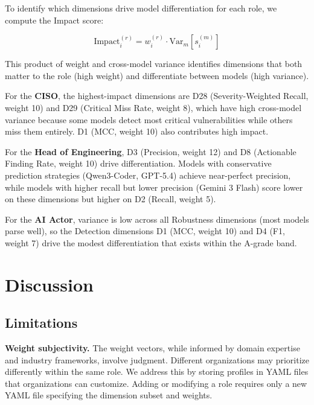 \documentclass[10pt,twocolumn]{article}
\begin{document}
To identify which dimensions drive model differentiation for each role, we compute the Impact score:

\begin{equation}
\text{Impact}_i^{(r)} = w_i^{(r)} \cdot \text{Var}_{m}[s_i^{(m)}]
\label{eq:impact}
\end{equation}

This product of weight and cross-model variance identifies dimensions that both matter to the role (high weight) and differentiate between models (high variance).

For the \textbf{CISO}, the highest-impact dimensions are D28 (Severity-Weighted Recall, weight 10) and D29 (Critical Miss Rate, weight 8), which have high cross-model variance because some models detect most critical vulnerabilities while others miss them entirely. D1 (MCC, weight 10) also contributes high impact.

For the \textbf{Head of Engineering}, D3 (Precision, weight 12) and D8 (Actionable Finding Rate, weight 10) drive differentiation. Models with conservative prediction strategies (Qwen3-Coder, GPT-5.4) achieve near-perfect precision, while models with higher recall but lower precision (Gemini 3 Flash) score lower on these dimensions but higher on D2 (Recall, weight 5).

For the \textbf{AI Actor}, variance is low across all Robustness dimensions (most models parse well), so the Detection dimensions D1 (MCC, weight 10) and D4 (F1, weight 7) drive the modest differentiation that exists within the A-grade band.

\section{Discussion}
\label{sec:discussion}

\subsection{Limitations}

\textbf{Weight subjectivity.} The weight vectors, while informed by domain expertise and industry frameworks, involve judgment. Different organizations may prioritize differently within the same role. We address this by storing profiles in YAML files that organizations can customize. Adding or modifying a role requires only a new YAML file specifying the dimension subset and weights.
\end{document}
